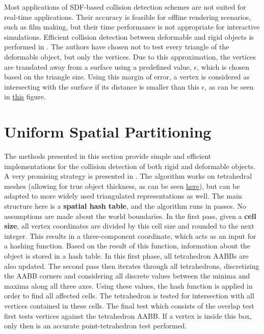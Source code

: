 Most applications of SDF-based collision detection schemes are not suited for real-time applications. Their accuracy is feasible for offline rendering scenarios, such as film making, but their time performance is not appropriate for interactive simulations. Efficient collision detection between deformable and rigid objects is performed in \cite{fsg03}. The authors have chosen not to test every triangle of the deformable object, but only the vertices. Due to this approximation, the vertices are translated away from a surface using a predefined value, $\epsilon$, which is chosen based on the triangle size. Using this margin of error, a vertex is considered as intersecting with the surface if its distance is smaller than this $\epsilon$, as can be seen in \hyperref[img:sdf-eps]{this} figure.




\FloatBarrier
\section{Uniform Spatial Partitioning}
\label{sec:usp}



The methods presented in this section provide simple and efficient implementations for the collision detection of both rigid and deformable objects. A very promising strategy is presented in \citep{thm03}. The algorithm works on tetrahedral meshes (allowing for true object thickness, as can be seen \hyperref[img:tetra-hash]{here}), but can be adapted to more widely used triangulated representations as well. The main structure here is a \textbf{spatial hash table}, and the algorithm runs in passes. No assumptions are made about the world boundaries. In the first pass, given a \textbf{cell size}, all vertex coordinates are divided by this cell size and rounded to the next integer. This results in a three-component coordinate, which acts as an input for a hashing function. Based on the result of this function, information about the object is stored in a hash table. In this first phase, all tetrahedron AABBs are also updated. The second pass then iterates through all tetrahedrons, discretizing the AABB corners and considering all discrete values between the minima and maxima along all three axes. Using these values, the hash function is applied in order to find all affected cells. The tetrahedron is tested for intersection with all vertices contained in these cells. The final test which consists of the overlap test first tests vertices against the tetrahedron AABB. If a vertex is inside this box, only then is an accurate point-tetrahedron test performed.

